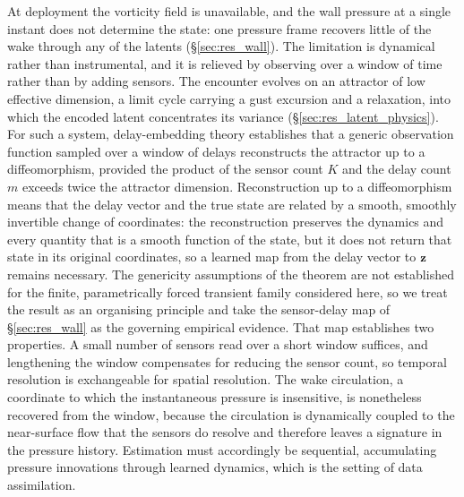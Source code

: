 At deployment the vorticity field is unavailable, and the wall pressure at a
single instant does not determine the state: one pressure frame recovers
little of the wake through any of the latents (\S\ref{sec:res_wall}). The
limitation is dynamical rather than instrumental, and it is relieved by
observing over a window of time rather than by adding sensors. The encounter
evolves on an attractor of low effective dimension, a limit cycle carrying a
gust excursion and a relaxation, into which the encoded latent concentrates its
variance (\S\ref{sec:res_latent_physics}). For such a system, delay-embedding
theory \citep{takens1981,sauer1991} establishes that a generic observation
function sampled over a window of delays reconstructs the attractor up to a
diffeomorphism, provided the product of the sensor count $K$ and the delay
count $m$ exceeds twice the attractor dimension. Reconstruction up to a
diffeomorphism means that the delay vector and the true state are related by a
smooth, smoothly invertible change of coordinates: the reconstruction preserves
the dynamics and every quantity that is a smooth function of the state, but it
does not return that state in its original coordinates, so a learned map from
the delay vector to $\mathbf{z}$ remains necessary. The genericity assumptions of
the theorem are not established for the finite, parametrically forced transient
family considered here, so we treat the result as an organising principle and
take the sensor-delay map of \S\ref{sec:res_wall} as the governing empirical
evidence. That map establishes two properties. A small number of sensors read
over a short window suffices, and lengthening the window compensates for
reducing the sensor count, so temporal resolution is exchangeable for spatial
resolution. The wake circulation, a coordinate to which the instantaneous
pressure is insensitive, is nonetheless recovered from the window, because the
circulation is dynamically coupled to the near-surface flow that the sensors do
resolve and therefore leaves a signature in the pressure history. Estimation
must accordingly be sequential, accumulating pressure innovations through
learned dynamics, which is the setting of data assimilation.\re

